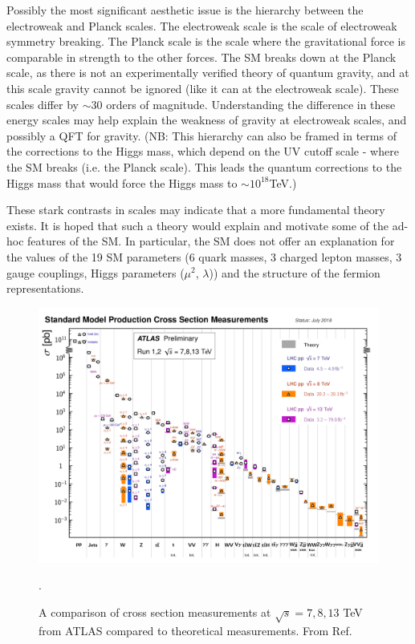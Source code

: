 Possibly the most significant aesthetic issue is the hierarchy between the electroweak and Planck scales. The electroweak scale is the scale of electroweak symmetry breaking. The Planck scale is the scale where the gravitational force is comparable in strength to the other forces. The SM breaks down at the Planck scale, as there is not an experimentally verified theory of quantum gravity, and at this scale gravity cannot be ignored (like it can at the electroweak scale). These scales differ by $\sim30$ orders of magnitude. Understanding the difference in these energy scales may help explain the weakness of gravity at electroweak scales, and possibly a QFT for gravity. (NB: This hierarchy can also be framed in terms of the corrections to the Higgs mass, which depend on the UV cutoff scale - where the SM breaks (i.e. the Planck scale). This leads the quantum corrections to the Higgs mass that would force the Higgs mass to $\sim 10^{18}$TeV.)

These stark contrasts in scales may indicate that a more fundamental theory exists. It is hoped that such a theory would explain and motivate some of the ad-hoc features of the SM. In particular, the SM does not offer an explanation for the values of the 19 SM parameters (6 quark masses, 3 charged lepton masses, 3 gauge couplings, Higgs parameters ($\mu^{2}$, $\lambda$)) and the structure of the fermion representations.


\begin{figure}[h!]
  \centering
  \includegraphics[width=\hsize]{figures/Theory/SM_xs.pdf}
  \caption{A comparison of cross section measurements at $\sqrt{s}=7,8,13$ TeV from ATLAS compared to theoretical measurements. From Ref. \cite{SM_XS_Comparison}}. 
  \label{fig:SM cross sections}
\end{figure}
\FloatBarrier


